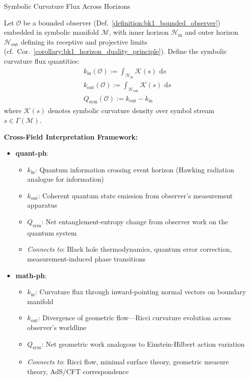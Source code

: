\begin{scholium}{Symbolic Curvature Flux Across Horizons}
\label{scholium:bk1_curvature_flux_kin_kout}

Let $\mathcal{O}$ be a bounded observer (Def.~\ref{definition:bk1_bounded_observer}) embedded in symbolic manifold $\mathcal{M}$, with inner horizon $\mathcal{H}_{\text{in}}$ and outer horizon $\mathcal{H}_{\text{out}}$ defining its receptive and projective limits (cf.~Cor.~\ref{corollary:bk1_horizon_duality_principle}). Define the symbolic curvature flux quantities:
\begin{gather}
k_{\text{in}}(\mathcal{O}) := \int_{\mathcal{H}_{\text{in}}} \mathcal{K}(s) \, \,\mathrm{d} s \\
k_{\text{out}}(\mathcal{O}) := \int_{\mathcal{H}_{\text{out}}} \mathcal{K}(s) \, \,\mathrm{d} s \\
Q_{\text{sym}}(\mathcal{O}) := k_{\text{out}} - k_{\text{in}}
\end{gather}
where $\mathcal{K}(s)$ denotes symbolic curvature density over symbol stream $s \in \Gamma(\mathcal{M})$.

\textbf{Cross-Field Interpretation Framework:}

\begin{itemize}
\item \textbf{quant-ph}: 
  \begin{itemize}
  \item $k_{\text{in}}$: Quantum information crossing event horizon (Hawking radiation analogue for information)
  \item $k_{\text{out}}$: Coherent quantum state emission from observer's measurement apparatus
  \item $Q_{\text{sym}}$: Net entanglement-entropy change from observer work on the quantum system
  \item \textit{Connects to}: Black hole thermodynamics, quantum error correction, measurement-induced phase transitions
  \end{itemize}

\item \textbf{math-ph}:
  \begin{itemize}
  \item $k_{\text{in}}$: Curvature flux through inward-pointing normal vectors on boundary manifold
  \item $k_{\text{out}}$: Divergence of geometric flow—Ricci curvature evolution across observer's worldline
  \item $Q_{\text{sym}}$: Net geometric work analogous to Einstein-Hilbert action variation
  \item \textit{Connects to}: Ricci flow, minimal surface theory, geometric measure theory, AdS/CFT correspondence
  \end{itemize}


\end{itemize}
\end{scholium}

